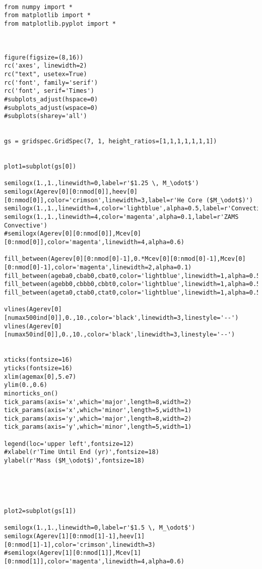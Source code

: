 \begin{verbatim}

from numpy import *
from matplotlib import *
from matplotlib.pyplot import *



figure(figsize=(8,16))
rc('axes', linewidth=2)
rc("text", usetex=True)
rc('font', family='serif')
rc('font', serif='Times')
#subplots_adjust(hspace=0)
#subplots_adjust(wspace=0)
#subplots(sharey='all')


gs = gridspec.GridSpec(7, 1, height_ratios=[1,1,1,1,1,1,1])


plot1=subplot(gs[0])

semilogx(1.,1.,linewidth=0,label=r'$1.25 \, M_\odot$')
semilogx(Agerev[0][0:nmod[0]],heev[0][0:nmod[0]],color='crimson',linewidth=3,label=r'He Core ($M_\odot$)')
semilogx(1.,1.,linewidth=4,color='lightblue',alpha=0.5,label=r'Convective')
semilogx(1.,1.,linewidth=4,color='magenta',alpha=0.1,label=r'ZAMS Convective')
#semilogx(Agerev[0][0:nmod[0]],Mcev[0][0:nmod[0]],color='magenta',linewidth=4,alpha=0.6)

fill_between(Agerev[0][0:nmod[0]-1],0.*Mcev[0][0:nmod[0]-1],Mcev[0][0:nmod[0]-1],color='magenta',linewidth=2,alpha=0.1)
fill_between(ageba0,cbab0,cbat0,color='lightblue',linewidth=1,alpha=0.5)
fill_between(agebb0,cbbb0,cbbt0,color='lightblue',linewidth=1,alpha=0.5)
fill_between(ageta0,ctab0,ctat0,color='lightblue',linewidth=1,alpha=0.5)

vlines(Agerev[0][numax500ind[0]],0.,10.,color='black',linewidth=3,linestyle='--')
vlines(Agerev[0][numax50ind[0]],0.,10.,color='black',linewidth=3,linestyle='--')


xticks(fontsize=16)
yticks(fontsize=16)
xlim(agemax[0],5.e7)
ylim(0.,0.6)
minorticks_on()
tick_params(axis='x',which='major',length=8,width=2)
tick_params(axis='x',which='minor',length=5,width=1)
tick_params(axis='y',which='major',length=8,width=2)
tick_params(axis='y',which='minor',length=5,width=1)

legend(loc='upper left',fontsize=12)
#xlabel(r'Time Until End (yr)',fontsize=18)
ylabel(r'Mass ($M_\odot$)',fontsize=18)





plot2=subplot(gs[1])

semilogx(1.,1.,linewidth=0,label=r'$1.5 \, M_\odot$')
semilogx(Agerev[1][0:nmod[1]-1],heev[1][0:nmod[1]-1],color='crimson',linewidth=3)
#semilogx(Agerev[1][0:nmod[1]],Mcev[1][0:nmod[1]],color='magenta',linewidth=4,alpha=0.6)


\end{verbatim}
